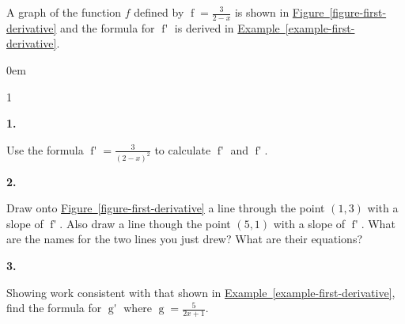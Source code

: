 \documentclass[12pt,]{book}
\theoremstyle{plain}
\theoremstyle{definition}
\numberwithin{equation}{section}
\newenvironment{exercisegroup}%
{\medskip\noindent}%
{\par\bigskip}%
\newlength{\exercisegroupindent}%
\newlength{\exercisegroupitemwidth}%
\newenvironment{exercisegrouplist}%
{\vspace{-\partopsep}%
\begin{adjustwidth}{\exercisegroupindent}{0em}}%
{\end{adjustwidth}%
\vspace{-\partopsep}%
\vspace{\baselineskip}}%
\newenvironment{exercisegroupbycol}[1]%
{\begin{exercisegrouplist}%
\vspace{-\multicolsep}%
\begin{multicols}{#1}%
\setlength{\parindent}{0em}%
\setlength{\exercisegroupitemwidth}{\linewidth}}%
{\end{multicols}%
\vspace{-\multicolsep}%
\end{exercisegrouplist}}%
\newenvironment{exercisegroupitem}[1]%
{\begin{minipage}[t]{\exercisegroupitemwidth}
\vspace{0pt}%
{\bfseries#1}%
\rule{0pt}{\baselineskip}}{\strut%
\end{minipage}%
\hspace{\columnsep}}%
\providecommand\phantomsection{}
\newcommand{\fe}[2]{\mathop{{#1}{\left(#2\right)}}}
\newcommand{\point}[2]{\left(#1,#2\right)}
\newcommand{\fd}[1]{#1'}
\begin{document}
\begin{exercisegroup}%
A graph of the function \(f\) defined by \(\fe{f}{x}=\frac{3}{2-x}\) is shown in \hyperref[figure-first-derivative]{Figure~\ref*{figure-first-derivative}} and the formula for \(\fe{\fd{f}}{x}\) is derived in \hyperref[example-first-derivative]{Example~\ref*{example-first-derivative}}.%
\par
\begin{exercisegroupbycol}{1}%
\begin{exercisegroupitem}{1. }\phantomsection\hypertarget{exercise-185}{\null}
Use the formula \(\fe{\fd{f}}{x}=\frac{3}{(2-x)^2}\) to calculate \(\fe{\fd{f}}{1}\) and \(\fe{\fd{f}}{5}\).%
\end{exercisegroupitem}%
\par%
\begin{exercisegroupitem}{2. }\phantomsection\hypertarget{exercise-186}{\null}
Draw onto \hyperref[figure-first-derivative]{Figure~\ref*{figure-first-derivative}} a line through the point \(\point{1}{3}\) with a slope of \(\fe{\fd{f}}{1}\). Also draw a line though the point \(\point{5}{1}\) with a slope of \(\fe{\fd{f}}{5}\). What are the names for the two lines you just drew? What are their equations?%
\end{exercisegroupitem}%
\par%
\begin{exercisegroupitem}{3. }\phantomsection\hypertarget{exercise-187}{\null}
Showing work consistent with that shown in \hyperref[example-first-derivative]{Example~\ref*{example-first-derivative}}, find the formula for \(\fe{\fd{g}}{x}\) where \(\fe{g}{x}=\frac{5}{2x+1}\).%
\end{exercisegroupitem}%
\par%
\end{exercisegroupbycol}%
\end{exercisegroup}%
\end{document}
